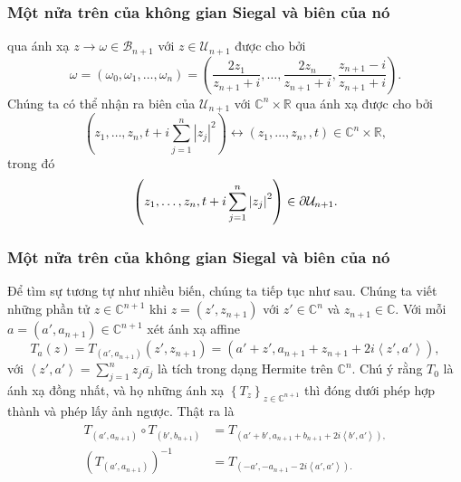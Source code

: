 \documentclass[11pt]{beamer}
\numberwithin{equation}{section}
\theoremstyle{plain}
\theoremstyle{definition}
\theoremstyle{remark}
\begin{document}
\begin{frame}\frametitle{Một nửa trên của không gian Siegal và biên của nó}
qua ánh xạ $z\to\omega\in\mathcal{B}_{n+1}$ với $z\in\mathcal{U}_{n+1}$ được cho bởi
\[\omega  = \left( {{\omega _0},{\omega _1}, \ldots ,{\omega _n}} \right) = \left( {\frac{{2{z_1}}}{{{z_{n + 1}} + i}}, \ldots ,\frac{{2{z_n}}}{{{z_{n + 1}} + i}},\frac{{{z_{n + 1}} - i}}{{{z_{n + 1}} + i}}} \right).\]
Chúng ta có thể nhận ra biên của $\mathcal{U}_{n+1}$ với $\mathbb{C}^{n}\times\mathbb{R}$ qua ánh xạ được cho bởi
\[\left( {{z_1}, \ldots ,{z_n},t + i\sum\limits_{j = 1}^n {{{\left| {{z_j}} \right|}^2}} } \right) \leftrightarrow \left( {{z_1}, \ldots ,{z_n},,t} \right) \in {\mathbb{C}^n} \times \mathbb{R},\]
trong đó
\[\left( {{z_1}, \ldots ,{z_n},t + i\sum\limits_{j = 1}^n {{{\left| {{z_j}} \right|}^2}} } \right) \in \partial {{\cal U}_{n + 1}}.\]
\end{frame}


\begin{frame}\frametitle{Một nửa trên của không gian Siegal và biên của nó}
Để tìm sự tương tự như nhiều biến, chúng ta tiếp tục như sau. Chúng ta viết những phần tử $z\in\mathbb{C}^{n+1}$ khi $z=\left(z',z_{n+1}\right)$ với $z'\in\mathbb{C}^{n}$ và $z_{n+1}\in\mathbb{C}$. Với mỗi $a=\left(a',a_{n+1}\right)\in\mathbb{C}^{n+1}$ xét ánh xạ affine
\[{T_a}\left( z \right) = {T_{\left( {a',{a_{n + 1}}} \right)}}\left( {z',{z_{n + 1}}} \right) = \left( {a' + z',{a_{n + 1}} + {z_{n + 1}} + 2i\left\langle {z',a'} \right\rangle } \right),\]
với $\left\langle {z',a'} \right\rangle  = \sum\limits_{j = 1}^n {{z_j}\overline {{a_j}} } $ là tích trong dạng Hermite trên $\mathbb{C}^n$. Chú ý rằng $T_{0}$ là ánh xạ đồng nhất, và họ những ánh xạ ${\left\{ {{T_z}} \right\}_{z \in {\mathbb{C}^{n + 1}}}}$ thì đóng dưới phép hợp thành và phép lấy ảnh ngược. Thật ra là 
\begin{eqnarray*}
\begin{split}
{T_{\left( {a',{a_{n + 1}}} \right)}}\circ {T_{\left( {b',{b_{n + 1}}} \right)}} &= {T_{\left( {a' + b',{a_{n + 1}} + {b_{n + 1}} + 2i\left\langle {b',a'} \right\rangle } \right),}}\\
{\left( {{T_{\left( {a',{a_{n + 1}}} \right)}}} \right)^{ - 1}} &= {T_{\left( { - a', - a{  _{n + 1}} - 2i\left\langle {a',a'} \right\rangle } \right).}}
\end{split}
\end{eqnarray*}
\end{frame}
\end{document}
